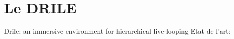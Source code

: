 \section{Le DRILE}
\begin{frame}

Drile: an immersive environment for hierarchical live-looping
Etat de l’art:

\end{frame}
